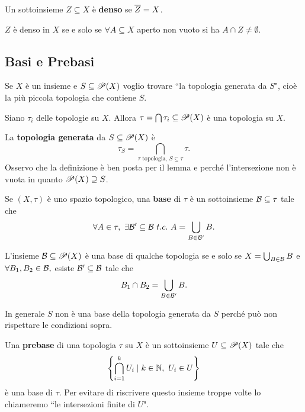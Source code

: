 \begin{multicols*}{2}
\begin{definition}
Un sottoinsieme $Z\subseteq X$ è \textbf{denso} se $\overline{Z}= X$.
\end{definition}

\begin{remark}
$Z$ è denso in $X$ se e solo se $\forall A\subseteq X$ aperto non vuoto si ha $A\cap Z\neq\emptyset$.
\end{remark}

\subsection{Basi e Prebasi}
Se $X$ è un insieme e $S\subseteq \mathscr{P}(X)$ voglio trovare ``la topologia generata da $S$", cioè la più piccola topologia che contiene $S$.
\begin{lemma}
Siano $\tau_i$ delle topologie su $X$. Allora $\tau=\bigcap \tau_i\subseteq\mathscr{P}(X)$ è una topologia su $X$.
\end{lemma}
\begin{definition}
La \textbf{topologia generata} da $S\subseteq\mathscr{P}(X)$ è
\[\tau_S=\bigcap_{\tau\text{ topologia, }S\subseteq \tau}\tau.\]
Osservo che la definizione è ben posta per il lemma e perché l'intersezione non è vuota in quanto $\mathscr{P}(X)\supseteq S$.
\end{definition}

\begin{definition}
Se $(X,\tau)$ è uno spazio topologico, una \textbf{base} di $\tau$ è un sottoinsieme $\mathcal{B}\subseteq \tau$ tale che \[\forall A\in \tau,\ \exists \mathcal{B}'\subseteq\mathcal{B}\ t.c.\ A=\bigcup_{B\in \mathcal{B}'}B.\]
\end{definition}

\begin{proposition}
L'insieme $\mathcal{B}\subseteq\mathscr{P}(X)$ è una base di qualche topologia se e solo se $X=\bigcup_{B\in \mathcal{B}}B$ e $\forall B_1,B_2\in \mathcal{B},$ esiste $ \mathcal{B}'\subseteq\mathcal{B}$ tale che \[B_1\cap B_2=\bigcup_{B\in \mathcal{B}'}B.\]
\end{proposition}
\begin{remark}
In generale $S$ non è una base della topologia generata da $S$ perché può non rispettare le condizioni sopra.
\end{remark}

\begin{definition}
Una \textbf{prebase} di una topologia $\tau$ su $X$ è un sottoinsieme $U\subseteq\mathscr{P}(X)$ tale che
\[\left\{\bigcap_{i=1}^k U_i\mid k\in\mathbb{N},\ U_i\in U\right\}\]
è una base di $\tau$. Per evitare di riscrivere questo insieme troppe volte lo chiameremo ``le intersezioni finite di $U$".
\end{definition}


\end{multicols*}
